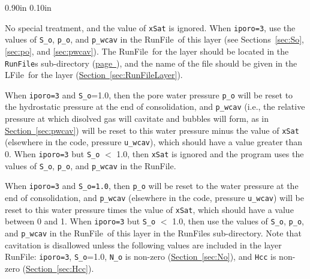 \documentclass[letterpaper,11pt]{article}
\newcommand{\RunFile}{\textsf{RunFile}}
\newcommand{\LFile}{\textsf{LFile}}
\newlength{\Labelwidth}
\newcommand{\Entrylabel}[1]{\makebox[\Labelwidth][r]{\texttt{#1}}}
\newenvironment{Options}
{\begin{list}{}{%
\renewcommand{\makelabel}{\Entrylabel}%
\setlength{\leftmargin} {0.90in}%
\setlength{\rightmargin}{0.00in}%
\setlength{\labelsep}   {0.10in}%
\setlength{\labelwidth} {\Labelwidth}%
}}
{\end{list}}
\begin{document}
\begin{Options}
	\item[lSat=0]
      No special treatment, and the value of \texttt{xSat}
      is ignored.
      When \texttt{iporo=3}, use the values of \texttt{S\_o},
      \texttt{p\_o}, and \texttt{p\_wcav} in the \RunFile\ of
      this layer
      (see Sections~\ref{sec:So}, \ref{sec:po}, and \ref{sec:pwcav}).
      The \RunFile\ for the layer 
      should be located in the \texttt{RunFile}s
      sub-directory 
      (\hyperref[item:RunFileDir]{page~\pageref*{item:RunFileDir}}),
      and the name of the file
      should be given in the \LFile\ for the layer
      (\hyperref[sec:RunFileLayer]{Section~\ref*{sec:RunFileLayer}}).
    \item[lSat=1]
      When \texttt{iporo=3} and \texttt{S\_o}=1.0,
      then the pore water pressure \texttt{p\_o} will be reset to the
      hydrostatic pressure at the end of consolidation,
      and \texttt{p\_wcav} (i.e., the relative pressure at which
      disolved gas will cavitate and bubbles will form,
      as in \hyperref[sec:pwcav]{Section~\ref*{sec:pwcav}})
      will be reset to this water pressure minus the value of
      \texttt{xSat} (elsewhere in the code, pressure \texttt{u\_wcav}),
      which should have a value greater than 0.
      When \texttt{iporo=3} but \texttt{S\_o} $<$ 1.0, 
      then \texttt{xSat} is ignored and the program uses
      the values of \texttt{S\_o}, \texttt{p\_o},
      and \texttt{p\_wcav} in the \RunFile.
    \item[lSat=2]
      When \texttt{iporo=3} and \texttt{S\_o=1.0},
      then \texttt{p\_o} will be reset to the
      water pressure at the end of consolidation,
      and \texttt{p\_wcav}
      (elsewhere in the code, pressure \texttt{u\_wcav})
      will be reset to this water pressure
      times the value of \texttt{xSat},
      which should have a value between 0 and 1.
      When \texttt{iporo=3} but \texttt{S\_o} $<$ 1.0,
      then use the values of
      \texttt{S\_o}, \texttt{p\_o}, and \texttt{p\_wcav}
      in the \RunFile\ of this 
      layer in the \RunFile s sub-directory.
      Note that cavitation is disallowed unless the following values
      are included in the layer \RunFile:
      \texttt{iporo=3}, \texttt{S\_o}=1.0,
      \texttt{N\_o} is non-zero
      (\hyperref[sec:No]{Section~\ref*{sec:No}}),
      and \texttt{Hcc} is non-zero
      (\hyperref[sec:Hcc]{Section~\ref*{sec:Hcc}}).
\end{Options}
%
%
\end{document}
